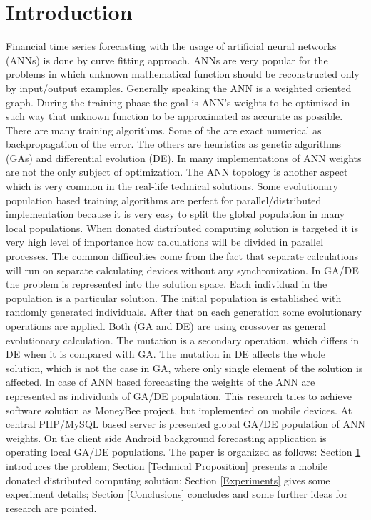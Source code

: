 \documentclass{llncs}
\begin{document}

\section{Introduction} \label{Introduction}

Financial time series forecasting with the usage of artificial neural networks (ANNs) is done by curve fitting approach. ANNs are very popular for the problems in which unknown mathematical function should be reconstructed only by input/output examples. Generally speaking the ANN is a weighted oriented graph. During the training phase the goal is ANN's weights to be optimized in such way that unknown function to be approximated as accurate as possible. There are many training algorithms. Some of the are exact numerical as backpropagation of the error. The others are heuristics as genetic algorithms (GAs) and differential evolution (DE). In many implementations of ANN weights are not the only subject of optimization. The ANN topology is another aspect which is very common in the real-life technical solutions. Some evolutionary population based training algorithms are perfect for parallel/distributed implementation because it is very easy to split the global population in many local populations. When donated distributed computing solution is targeted it is very high level of importance how calculations will be divided in parallel processes. The common difficulties come from the fact that separate calculations will run on separate calculating devices without any synchronization. In GA/DE the problem is represented into the solution space. Each individual in the population is a particular solution. The initial population is established with randomly generated individuals. After that on each generation some evolutionary operations are applied. Both (GA and DE) are using crossover as general evolutionary calculation. The mutation is a secondary operation, which differs in DE when it is compared with GA. The mutation in DE affects the whole solution, which is not the case in GA, where only single element of the solution is affected. In case of ANN based forecasting the weights of the ANN are represented as individuals of GA/DE population. This research tries to achieve software solution as MoneyBee project, but implemented on mobile devices. At central PHP/MySQL based server is presented global GA/DE population of ANN weights. On the client side Android background forecasting application is operating local GA/DE populations.  The paper is organized as follows: Section \ref{Introduction} introduces the problem; Section \ref{Technical Proposition} presents a mobile donated distributed computing solution; Section \ref{Experiments} gives some experiment details; Section \ref{Conclusions} concludes and some further ideas for research are pointed.
\end{document}
